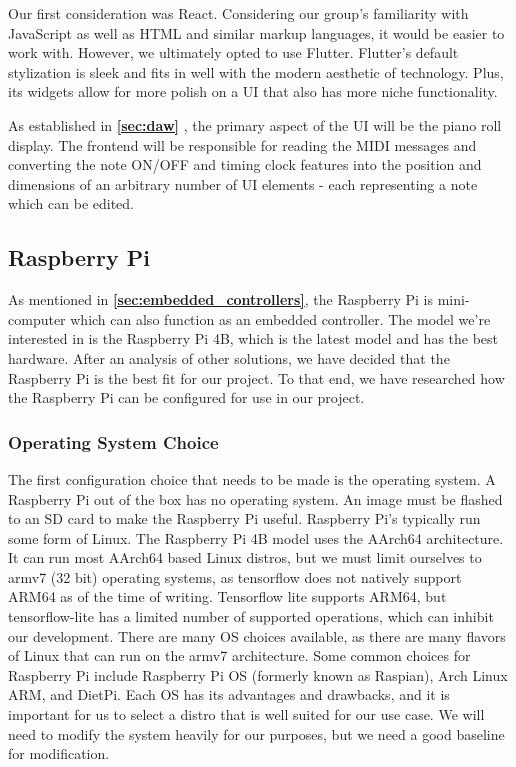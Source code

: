 Our first consideration was React. Considering our group's familiarity with JavaScript as
well as HTML and similar markup languages, it would be easier to work with. However, we
ultimately opted to use Flutter. Flutter's default stylization is sleek and fits in well
with the modern aesthetic of technology. Plus, its widgets allow for more polish on a UI
that also has more niche functionality.

As established in \textbf{\ref{sec:daw} }, the primary aspect of the UI
will be the piano roll display. The frontend will be responsible for reading the MIDI
messages and converting the note ON/OFF and timing clock features into the position and
dimensions of an arbitrary number of UI elements - each representing a note which can be
edited.

\subsection{Raspberry Pi}

As mentioned in \textbf{\ref{sec:embedded_controllers}},
the Raspberry Pi is mini-computer which can also function as an embedded controller. The
model we're interested in is the Raspberry Pi 4B, which is the latest model and has the
best hardware. After an analysis of other solutions, we have decided that the
Raspberry Pi is the best fit for our project. To that end, we have researched how the
Raspberry Pi can be configured for use in our project.

\subsubsection{Operating System Choice}

The first configuration choice that needs to be made is the operating system. A Raspberry
Pi out of the box has no operating system. An image must be flashed to an SD card to make
the Raspberry Pi useful. Raspberry Pi's typically run some form of Linux. The Raspberry Pi
4B model uses the AArch64 architecture. It can run most AArch64 based Linux distros, but
we must limit ourselves to armv7 (32 bit) operating systems, as tensorflow does not
natively support ARM64 as of the time of writing. Tensorflow lite supports ARM64, but
tensorflow-lite has a limited number of supported operations, which can inhibit our
development. There are many OS choices available, as there are many flavors of Linux that
can run on the armv7 architecture. Some common choices for Raspberry Pi include Raspberry
Pi OS (formerly known as Raspian), Arch Linux ARM, and DietPi. Each OS has its advantages
and drawbacks, and it is important for us to select a distro that is well suited for our
use case. We will need to modify the system heavily for our purposes, but we need a good
baseline for modification.

